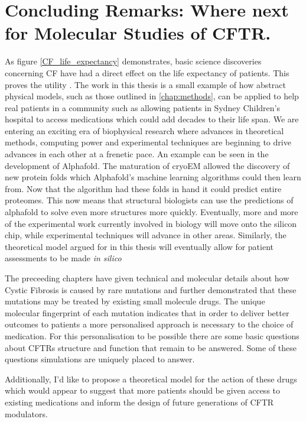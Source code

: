 \chapter{Concluding Remarks: Where next for Molecular Studies of CFTR.}
\label{chap:conclusions}

As figure \ref{CF_life_expectancy} demonstrates, basic science discoveries concerning CF have had a direct effect on the life expectancy of patients. This proves the utility . The work in this thesis is a small example of how abstract physical models, such as those outlined in \ref{chap:methods}, can be applied to help real patients in a community such as allowing patients in Sydney Children's hospital to access medications which could add decades to their life span. We are entering an exciting era of biophysical research where advances in theoretical methods, computing power and experimental techniques are beginning to drive advances in each other at a frenetic pace. An example can be seen in the development of Alphafold. The maturation of cryoEM allowed the discovery of new protein folds which Alphafold's machine learning algorithms could then learn from. Now that the algorithm had these folds in hand it could predict entire proteomes. This now means that structural biologists can use the predictions of alphafold to solve even more structures more quickly. Eventually, more and more of the experimental work currently involved in biology will move onto the silicon chip, while experimental techniques will advance in other areas. Similarly, the theoretical model argued for in this thesis will eventually allow for patient assessments to be made \textit{in silico}

The preceeding chapters have given technical and molecular details about how Cystic Fibrosis is caused by rare mutations and further demonstrated that these mutations may be treated by existing small molecule drugs. The unique molecular fingerprint of each mutation indicates that in order to deliver better outcomes to patients a more personalised approach is necessary to the choice of medication. For this personalisation to be possible there are some basic questions about CFTRs structure and function that remain to be answered. Some of these questions simulations are uniquely placed to answer. 

Additionally, I'd like to propose a theoretical model for the action of these drugs which would appear to suggest that more patients should be given access to existing medications and inform the design of future generations of CFTR modulators. 

